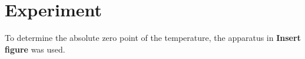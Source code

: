 \section{Experiment}


    To determine the absolute zero point of the temperature, the apparatus in \textbf{Insert figure} was used.
    
